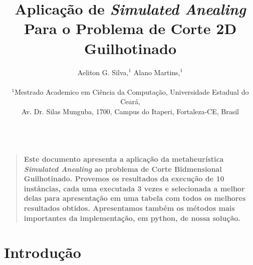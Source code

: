 \documentclass[12pt]{article}
\title{Aplicação de {\it Simulated Anealing\/} Para o Problema de Corte 2D Guilhotinado}
\author
{Aeliton G. Silva,$^{1}$ Alano Martins,$^{1}$\\
\\
\normalsize{$^{1}$Mestrado Academico em Ciência da Computação, Universidade Estadual do Ceará,}\\
\normalsize{Av. Dr. Silas Munguba, 1700, Campus do Itaperi, Fortaleza-CE, Brasil}\\
\\
}
\date{}
\newenvironment{sciabstract}{%
\begin{quote} \bf}
{\end{quote}}
\begin{document}
 


\baselineskip24pt


\maketitle 




\begin{sciabstract}
    Este documento apresenta a aplicação da metaheurística \textit{Simulated
    Anealing} ao problema de Corte Bidmensional Guilhotinado. Provemos os
    resultados da execução de 10 instâncias, cada uma executada 3 vezes e
    selecionada a melhor delas para apresentação em uma tabela com todos os
    melhores resultados obtidos. Apresentamos também os métodos mais
    importantes da implementação, em python, de nossa solução.
\end{sciabstract}


\section*{Introdução}
\end{document}

